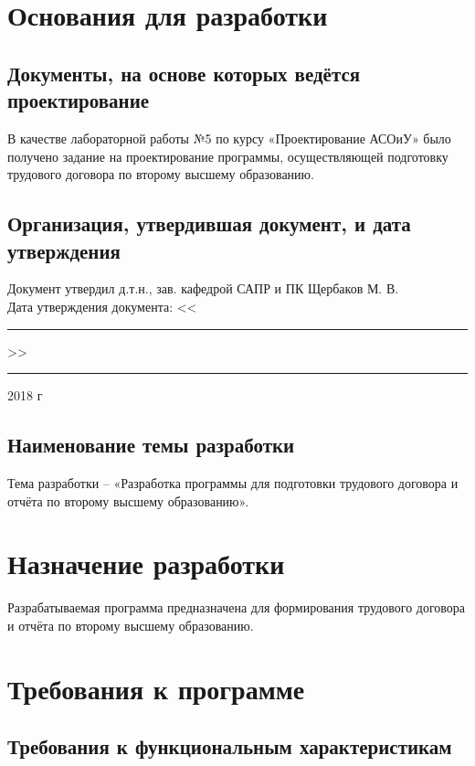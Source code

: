 \documentclass[14pt]{extarticle}
\begin{document}
\section{Основания для разработки}
    \subsection{Документы, на основе которых ведётся проектирование}
    В качестве лабораторной работы №5 по курсу «Проектирование АСОиУ» было получено задание на проектирование программы, осуществляющей подготовку трудового договора по второму высшему образованию.
    \subsection{Организация, утвердившая документ, и дата утверждения}
    Документ утвердил д.т.н., зав. кафедрой САПР и ПК Щербаков М. В.\\
    Дата утверждения документа: <<\rule{7mm}{0.4pt}>> \rule{35mm}{0.4pt} 2018 г
    \subsection{Наименование темы разработки}
    Тема разработки – «Разработка программы для подготовки трудового договора и отчёта по второму высшему образованию».
    
\section{Назначение разработки}
Разрабатываемая программа предназначена для формирования трудового договора и отчёта по второму высшему образованию.

\section{Требования к программе}
    \subsection{Требования к функциональным характеристикам}
\end{document}
